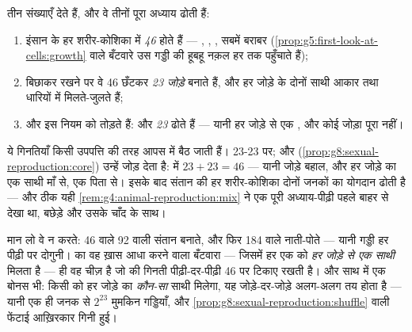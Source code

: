 \begin{proposition}[इंसानी गिनतियाँ]\label{prop:g9:chromosomes:counts}
 तीन संख्याएँ देते हैं, और वे तीनों पूरा अध्याय ढोती हैं:
\begin{enumerate}
  \item इंसान के हर शरीर-कोशिका में \emph{46}  होते हैं ---
        , , , सबमें बराबर
        (\cref{prop:g5:first-look-at-cells:growth} वाले बँटवारे उस
        गड्डी की हूबहू नक़ल हर  तक पहुँचाते हैं);
  \item बिछाकर रखने पर वे 46 छँटकर \emph{23 जोड़े} बनाते हैं, और हर
        जोड़े के दोनों साथी आकार तथा धारियों में मिलते-जुलते हैं;
  \item और \emph{} इस नियम को तोड़ते हैं:  और 
        \emph{23} ढोते हैं --- यानी हर जोड़े से एक , और कोई
        जोड़ा पूरा नहीं।
\end{enumerate}
\end{proposition}
\admitted

\begin{example}[निषेचन का गणित]\label{ex:g9:chromosomes:arithmetic}
ये गिनतियाँ किसी उपपत्ति की तरह आपस में बैठ जाती हैं।  23-23 पर;
और  (\cref{prop:g8:sexual-reproduction:core}) उन्हें जोड़ देता
है:  में $23 + 23 = 46$ --- यानी जोड़े बहाल, और हर जोड़े का एक
साथी माँ से, एक पिता से। इसके बाद संतान की हर शरीर-कोशिका दोनों जनकों का
योगदान ढोती है --- और ठीक यही \cref{rem:g4:animal-reproduction:mix} ने
एक पूरी अध्याय-पीढ़ी पहले बाहर से देखा था, बछेड़े और उसके चाँद के साथ।
\end{example}

\begin{remark}[युग्मकों को आधा क्यों करना ही है]\label{rem:g9:chromosomes:whyhalve}
मान लो वे न करते: 46  वाले  92  वाली संतान
बनाते, और फिर 184  वाले नाती-पोते --- यानी गड्डी हर पीढ़ी पर
दोगुनी।  का वह ख़ास आधा करने वाला बँटवारा --- जिसमें हर एक को
\emph{हर जोड़े से एक साथी} मिलता है --- ही वह चीज़ है जो  की
गिनती पीढ़ी-दर-पीढ़ी 46 पर टिकाए रखती है। और साथ में एक बोनस भी: किसी
 को हर जोड़े का \emph{कौन-सा} साथी मिलेगा, यह जोड़े-दर-जोड़े अलग-अलग
तय होता है --- यानी एक ही जनक से $2^{23}$ मुमकिन गड्डियाँ, और
\cref{prop:g8:sexual-reproduction:shuffle} वाली फेंटाई आख़िरकार गिनी
हुई।
\end{remark}

